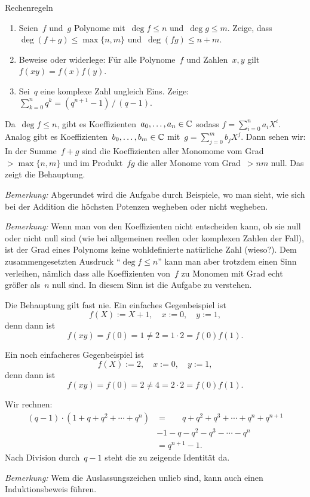 \documentclass{algblatt}
\begin{document}
\begin{aufgabe}{Rechenregeln}
\begin{enumerate}
\item Seien~$f$ und~$g$ Polynome mit~$\deg f \leq n$ und~$\deg g \leq m$.
Zeige, dass $\deg(f+g) \leq \max\{n,m\}$ und~$\deg(fg) \leq n+m$.
\item Beweise oder widerlege: Für alle Polynome~$f$ und Zahlen~$x,y$ gilt~$f(xy) = f(x) f(y)$.
\item Sei~$q$ eine komplexe Zahl ungleich Eins. Zeige: $\sum_{k=0}^n q^k =
(q^{n+1}-1)\,/\,(q-1).$
\end{enumerate}
\begin{loesungE}
\item Da~$\deg f \leq n$, gibt es Koeffizienten~$a_0,\ldots,a_n \in \mathbb{C}$
sodass $f = \sum_{i=0}^n a_i X^i$. Analog gibt es Koeffizienten~$b_0,\ldots,b_m
\in \mathbb{C}$ mit~$g = \sum_{j=0}^m b_j X^j$. Dann sehen wir: In der Summe~$f+g$
sind die Koeffizienten aller Monomome vom Grad~$> \max\{n,m\}$ und im
Produkt~$fg$ die aller Monome vom Grad~$> nm$ null. Das zeigt die Behauptung.

\emph{Bemerkung:} Abgerundet wird die Aufgabe durch Beispiele, wo man sieht,
wie sich bei der Addition die höchsten Potenzen wegheben oder nicht wegheben.

\emph{Bemerkung:} Wenn man von den Koeffizienten nicht entscheiden kann, ob sie
null oder nicht null sind (wie bei allgemeinen reellen oder komplexen Zahlen
der Fall), ist der Grad eines Polynoms keine wohldefinierte natürliche Zahl
(wieso?). Dem zusammengesetzten Ausdruck "`$\deg f \leq n$"' kann man aber
trotzdem einen Sinn verleihen, nämlich dass alle Koeffizienten von~$f$ zu
Monomen mit Grad echt größer als~$n$ null sind. In diesem Sinn ist die Aufgabe
zu verstehen.

\item Die Behauptung gilt fast nie. Ein einfaches Gegenbeispiel ist
\[ f(X) := X + 1, \quad x := 0, \quad y := 1, \]
denn dann ist
\[ f(xy) = f(0) = 1 \neq 2 = 1 \cdot 2 = f(0) f(1). \]

Ein noch einfacheres Gegenbeispiel ist
\[ f(X) := 2, \quad x := 0, \quad y := 1, \]
denn dann ist
\[ f(xy) = f(0) = 2 \neq 4 = 2 \cdot 2 = f(0) f(1). \]

\item Wir rechnen:
\begin{align*}
  (q-1) \cdot (1 + q + q^2 + \cdots + q^n) &=
    \phantom{1\mathop{-}{}} q + q^2 + q^3 + \cdots + q^n + q^{n+1} \\
  &-1 - q - q^2 - q^3 - \cdots - q^n \\
  &= q^{n+1} - 1.
\end{align*}
Nach Division durch~$q-1$ steht die zu zeigende Identität da.

\emph{Bemerkung:} Wem die Auslassungszeichen unlieb sind, kann auch einen
Induktionsbeweis führen.
\end{loesungE}
\end{aufgabe}
\end{document}
